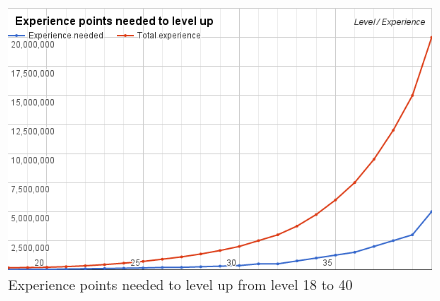 \begin{figure}[h]
	\centering
	\includegraphics[width=\textwidth]{Figures/experience-per-level}
	\caption{Experience points needed to level up from level 18 to 40}
	\label{fig:experience-per-level}
\end{figure}


